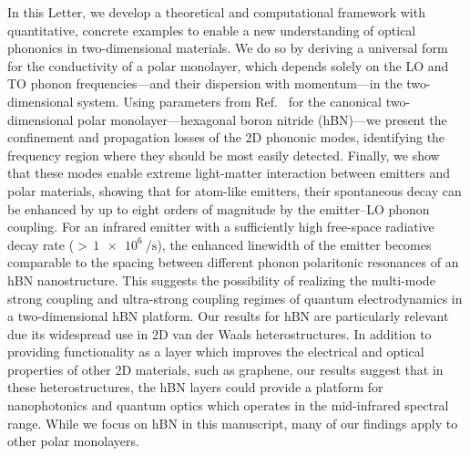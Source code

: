 \documentclass[aps,prb,twocolumn,
	           groupedaddress,superscriptaddress,
               amsfonts,amssymb,amsmath,floatfix,
	           citeautoscript]{revtex4-1}
\begin{document}
In this Letter, we develop a theoretical and computational framework with quantitative, concrete examples to enable a new understanding of optical phononics in two-dimensional materials. We do so by deriving a universal form for the conductivity of a polar monolayer,  which depends solely on the LO and TO phonon frequencies---and their dispersion with momentum---in the two-dimensional system. Using parameters from Ref.~ for the canonical two-dimensional polar monolayer---hexagonal boron nitride (hBN)---we present the confinement and propagation losses of the 2D phononic modes, identifying the frequency region where they should be most easily detected. Finally, we show that these modes enable extreme light-matter interaction between emitters and polar materials, showing that for atom-like emitters, their spontaneous decay can be enhanced by up to eight orders of magnitude by the emitter--LO phonon coupling. For an infrared emitter with a sufficiently high free-space radiative decay rate (${>}\, \SI{1e6}{\per\s}$), the enhanced linewidth of the emitter becomes comparable to the spacing between different phonon polaritonic resonances of an hBN nanostructure. This suggests the possibility of realizing the multi-mode strong coupling and ultra-strong coupling regimes of quantum electrodynamics in a two-dimensional hBN platform. Our results for hBN are particularly relevant due its widespread use in 2D van der Waals heterostructures. In addition to providing functionality as a layer which improves the electrical and optical properties of other 2D materials, such as graphene, our results suggest that in these heterostructures, the hBN layers could provide a platform for nanophotonics and quantum optics which operates in the mid-infrared spectral range. While we focus on hBN in this manuscript, many of our findings apply to other polar monolayers.
\end{document}
